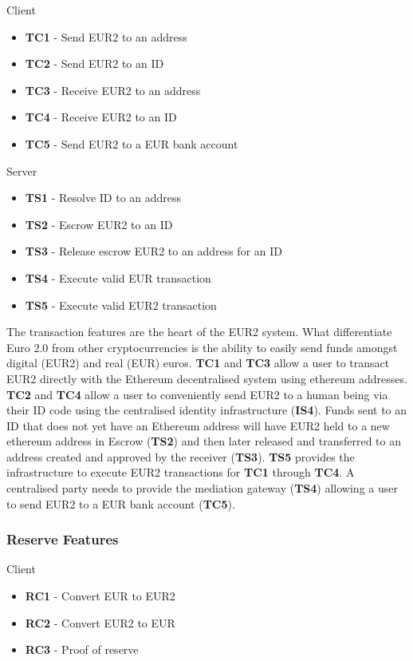 \documentclass[12pt]{article} %
\begin{document}
{{Client
\begin{itemize}
	\item \textbf{TC1} - Send EUR2 to an address
	\item \textbf{TC2} - Send EUR2 to an ID
	\item \textbf{TC3} - Receive EUR2 to an address
	\item \textbf{TC4} - Receive EUR2 to an ID
	\item \textbf{TC5} - Send EUR2 to a EUR bank account
\end{itemize}

Server
\begin{itemize}
	\item \textbf{TS1} - Resolve ID to an address
	\item \textbf{TS2} - Escrow EUR2 to an ID
	\item \textbf{TS3} - Release escrow EUR2 to an address for an ID
	\item \textbf{TS4} - Execute valid EUR transaction
	\item \textbf{TS5} - Execute valid EUR2 transaction
\end{itemize}

The transaction features are the heart of the EUR2 system. What differentiate Euro 2.0 from other cryptocurrencies is the ability to easily send funds amongst digital (EUR2) and real (EUR) euros. \textbf{TC1} and \textbf{TC3} allow a user to transact EUR2 directly with the Ethereum decentralised system using ethereum addresses. \textbf{TC2} and \textbf{TC4} allow a user to conveniently send EUR2 to a human being via their ID code using the centralised identity infrastructure (\textbf{IS4}). Funds sent to an ID that does not yet have an Ethereum address will have EUR2 held to a new ethereum address in Escrow (\textbf{TS2}) and then later released and transferred to an address created and approved by the receiver (\textbf{TS3}). \textbf{TS5} provides the infrastructure to execute EUR2 transactions for \textbf{TC1} through \textbf{TC4}. A centralised party needs to provide the mediation gateway (\textbf{TS4}) allowing a user to send EUR2 to a EUR bank account (\textbf{TC5}).

\subsubsection{Reserve Features} \label{sssec:3.3:reserve}

Client
\begin{itemize}
	\item \textbf{RC1} - Convert EUR to EUR2
	\item \textbf{RC2} - Convert EUR2 to EUR
	\item \textbf{RC3} - Proof of reserve
\end{itemize}

}}
\end{document}
